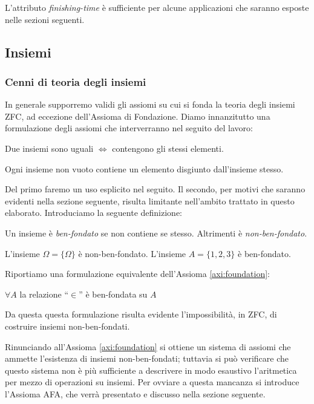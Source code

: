 L'attributo \emph{finishing-time} è sufficiente per alcune applicazioni che saranno esposte nelle sezioni seguenti.

\subsection{Insiemi}
\subsubsection{Cenni di teoria degli insiemi}
In generale supporremo validi gli assiomi su cui si fonda la teoria degli insiemi ZFC, ad eccezione dell'Assioma di Fondazione. Diamo innanzitutto una formulazione degli assiomi che interverranno nel seguito del lavoro:
\begin{axiom}[di estensionalità]
    Due insiemi sono uguali $\iff$ contengono gli stessi elementi.
\end{axiom}
\begin{axiom}[di fondazione]
    Ogni insieme non vuoto contiene un elemento disgiunto dall'insieme stesso.
    \label{axi:foundation}
\end{axiom}
Del primo faremo un uso esplicito nel seguito. Il secondo, per motivi che saranno evidenti nella sezione seguente, risulta limitante nell'ambito trattato in questo elaborato. Introduciamo la seguente definizione:
\begin{definition}
    Un insieme è \emph{ben-fondato} se non contiene se stesso. Altrimenti è \emph{non-ben-fondato}.
\end{definition}
\begin{example}
    L'insieme $\Omega = \{\Omega\}$ è non-ben-fondato. L'insieme $A = \{1,2,3\}$ è ben-fondato.
\end{example}
Riportiamo una formulazione equivalente dell'Assioma \ref{axi:foundation}:
\begin{axiom*}
    $\forall A$ la relazione ``$\in$'' è ben-fondata su $A$ \cite[Chapter III.4]{kunen}
\end{axiom*}
Da questa questa formulazione risulta evidente l'impossibilità, in ZFC, di costruire insiemi non-ben-fondati.

Rinunciando all'Assioma \ref{axi:foundation} si ottiene un sistema di assiomi che ammette l'esistenza di insiemi non-ben-fondati; tuttavia si può verificare che questo sistema non è più sufficiente a descrivere in modo esaustivo l'aritmetica per mezzo di operazioni su insiemi. Per ovviare a questa mancanza si introduce l'Assioma AFA, che verrà presentato e discusso nella sezione seguente.

